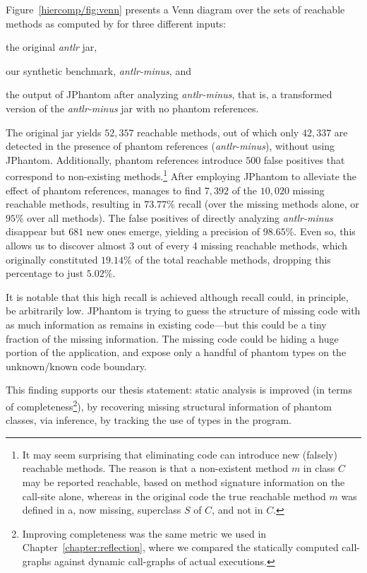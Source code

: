 \begin{itemize}[--]
  Figure~\ref{hiercomp/fig:venn} presents a Venn diagram over the sets of
  reachable methods as computed by \doop{} for three different
  inputs:
  \begin{inparaenum}[(i)]
  \item the original \emph{antlr} jar,
  \item our synthetic benchmark, \emph{antlr-minus}, and
  \item the output of JPhantom after analyzing \emph{antlr-minus},
    that is, a transformed version of the \emph{antlr-minus} jar with
    no phantom references.
  \end{inparaenum}
  The original jar yields $52,357$ reachable methods, out of which
  only $42,337$ are detected in the presence of phantom references
  (\emph{antlr-minus}), without using JPhantom. Additionally, phantom
  references introduce $500$ false positives that correspond to
  non-existing methods.\footnote{It may seem surprising that
    eliminating code can introduce new (falsely) reachable
    methods. The reason is that a non-existent method $m$ in class $C$
    may be reported reachable, based on method signature information
    on the call-site alone, whereas in the original code the true
    reachable method $m$ was defined in a, now missing, superclass $S$
    of $C$, and not in $C$.} After employing JPhantom to alleviate the
  effect of phantom references, \doop{} manages to find $7,392$ of the
  $10,020$ missing reachable methods, resulting in $73.77\%$ recall
  (over the missing methods alone, or $95\%$ over all methods). The
  false positives of directly analyzing \emph{antlr-minus} disappear
  but $681$ new ones emerge, yielding a precision of $98.65\%$. Even
  so, this allows us to discover almost 3 out of every 4 missing
  reachable methods, which originally constituted $19.14\%$ of the
  total reachable methods, dropping this percentage to just $5.02\%$.

  It is notable that this high recall is achieved although recall
  could, in principle, be arbitrarily low. JPhantom is trying to guess
  the structure of missing code with as much information as remains in
  existing code---but this could be a tiny fraction of the missing
  information. The missing code could be hiding a huge portion of the
  application, and expose only a handful of phantom types on the
  unknown/known code boundary.

  This finding supports our thesis statement: static analysis is
  improved (in terms of completeness\footnote{Improving completeness
    was the same metric we used in Chapter~\ref{chapter:reflection},
    where we compared the statically computed call-graphs against
    dynamic call-graphs of actual executions.}), by recovering missing
  structural information of phantom classes, via inference, by
  tracking the use of types in the program.

\end{itemize}

